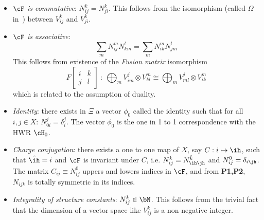 \documentclass[11pt]{article}
\begin{document}
\begin{itemize}
\item[{\bf P1}:]
     $\cF$ {\em is commutative}: $N_{ij}^k=N_{ji}^k$. This follows from the
     isomorphism (called $\Omega$ in~\cite{ms}) between $V_{ij}^k$ and
     $V_{ji}^k$.
\item[{\bf P2}:]
     $\cF$ {\em is associative}:
     \[
     \sum_m N_{ij}^m N_{km}^l = \sum_m N_{ik}^m N_{jm}^l
     \]
     This follows from existence of the {\em Fusion matrix} isomorphism
     \[
     F\left[\begin{array}{cc}i&k\\j&l\end{array}\right]~:~
     \bigoplus_m V_{im}^j \otimes V_{kl}^m \cong
     \bigoplus_m V_{ml}^j \otimes V_{ik}^m
     \]
     which is related to the assumption of duality.
\item[{\bf P3}:]
     {\em Identity}: there exists in $\Xi$ a vector $\phi_0$ called the
     identity such that for all $i,j\in X$: $N_{0i}^j=\delta_i^j$. The vector
     $\phi_0$ is the one in 1 to 1 correspondence with the HWR $\cH_0$.
\item[{\bf P4}:]
     {\em Charge conjugation}: there exists a one to one map of $X$, say
     $C:i\mapsto \ih$, such that $\hat{\ih}=i$ and $\cF$ is invariant under
     $C$, i.e. $N_{ij}^k=N_{\ih\jh}^{\hat{k}}$ and $N_{ij}^0=\delta_{i\jh}$.
     The matrix $C_{ij}\equiv N_{ij}^0$ uppers and lowers indices in
     $\cF$, and from {\bf P1,P2}, $N_{ijk}$ is totally symmetric in its
     indices.
\item[{\bf P5}:]
     {\em Integrality of structure constants}: $N_{ij}^k\in \bN$. This
     follows from the trivial fact that the dimension of a vector space
     like $V_{ij}^k$ is a non-negative integer.
\end{itemize}
\end{document}
